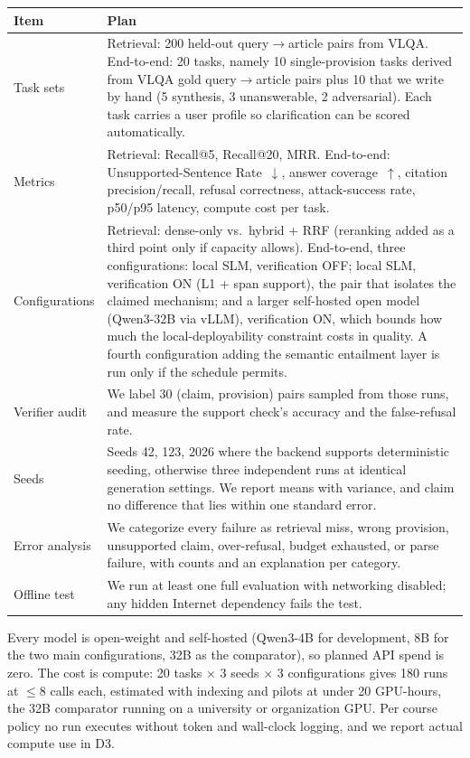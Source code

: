 {\small
\noindent
\begin{tabularx}{\textwidth}{@{} >{\raggedright\arraybackslash}p{2.3cm} X @{}}
\toprule
\textbf{Item} & \textbf{Plan} \\
\midrule
Task sets & Retrieval: 200 held-out query$\rightarrow$article pairs from VLQA. End-to-end: 20 tasks, namely 10 single-provision tasks derived from VLQA gold query$\rightarrow$article pairs plus 10 that we write by hand (5 synthesis, 3 unanswerable, 2 adversarial). Each task carries a user profile so clarification can be scored automatically. \\
Metrics & Retrieval: Recall@5, Recall@20, MRR. End-to-end: Unsupported-Sentence Rate~$\downarrow$, answer coverage~$\uparrow$, citation precision/recall, refusal correctness, attack-success rate, p50/p95 latency, compute cost per task. \\
Configurations & Retrieval: dense-only vs.\ hybrid + RRF (reranking added as a third point only if capacity allows). End-to-end, three configurations: local SLM, verification OFF; local SLM, verification ON (L1 + span support), the pair that isolates the claimed mechanism; and a larger self-hosted open model (Qwen3-32B via vLLM), verification ON, which bounds how much the local-deployability constraint costs in quality. A fourth configuration adding the semantic entailment layer is run only if the schedule permits. \\
Verifier audit & We label 30 (claim, provision) pairs sampled from those runs, and measure the support check's accuracy and the false-refusal rate. \\
Seeds & Seeds 42, 123, 2026 where the backend supports deterministic seeding, otherwise three independent runs at identical generation settings. We report means with variance, and claim no difference that lies within one standard error. \\
Error analysis & We categorize every failure as retrieval miss, wrong provision, unsupported claim, over-refusal, budget exhausted, or parse failure, with counts and an explanation per category. \\
Offline test & We run at least one full evaluation with networking disabled; any hidden Internet dependency fails the test. \\
\bottomrule
\end{tabularx}
}

Every model is open-weight and self-hosted (Qwen3-4B for development, 8B for the two main configurations, 32B as the comparator), so planned API spend is zero. The cost is compute: 20 tasks $\times$ 3 seeds $\times$ 3 configurations gives 180 runs at $\leq$8 calls each, estimated with indexing and pilots at under 20 GPU-hours, the 32B comparator running on a university or organization GPU. Per course policy no run executes without token and wall-clock logging, and we report actual compute use in D3.


